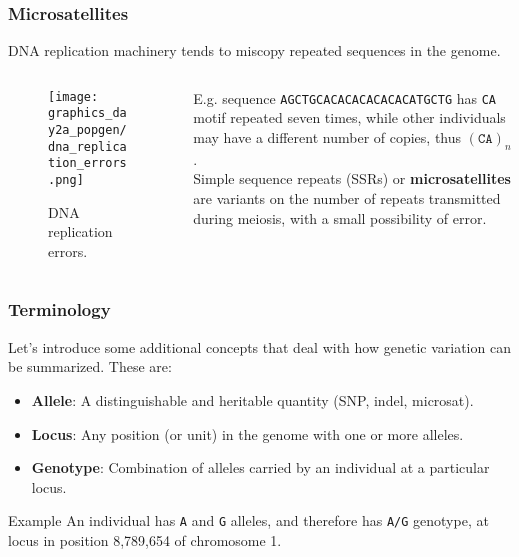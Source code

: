 \documentclass{beamer}
\newcommand{\1}{\ensuremath{\mathbf{1}}}
\begin{document}
%
%
%
\begin{frame}\frametitle{Microsatellites}
	DNA replication machinery tends to miscopy repeated sequences in the genome.
	\begin{columns}
	\begin{column}{.32\textwidth}
		\begin{figure}
		\begin{center}
			\texttt{[image: graphics\_day2a\_popgen/dna\_replication\_errors.png]}
		\end{center}
		\caption{DNA replication errors.}
		\end{figure}
	\end{column}
	\begin{column}{.68\textwidth}
		E.g. sequence \texttt{AGCTGCACACACACACACATGCTG} has \texttt{CA} motif repeated seven times, while other individuals may have a different number of copies, thus $(\texttt{CA})_n$.\\[2ex]
		Simple sequence repeats (SSRs) or \textbf{microsatellites} are variants on the number of repeats transmitted during meiosis, with a small possibility of error.
	\end{column}
	\end{columns}
\end{frame}
%
%
%
\begin{frame}\frametitle{Terminology}
	Let’s introduce some additional concepts that deal with how genetic variation can be summarized. These are:
	\begin{itemize}
		\item \textbf{Allele}: A distinguishable and heritable quantity (SNP, indel, microsat).
		\item \textbf{Locus}: Any position (or unit) in the genome with one or more alleles.
		\item \textbf{Genotype}: Combination of alleles carried by an individual at a particular locus.
	\end{itemize}
	\begin{block}{Example}
		An individual has \texttt{A} and \texttt{G} alleles, and therefore has \texttt{A/G} genotype, at locus in position 8,789,654 of chromosome 1.
	\end{block}
\end{frame}
\end{document}
